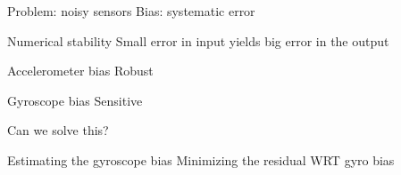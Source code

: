 \documentclass{beamer}
\begin{document}
\begin{frame}{Problem: noisy sensors}
Bias: systematic error
\end{frame}

\begin{frame}{Numerical stability}
Small error in input yields big error in the output
\end{frame}
\begin{frame}{Accelerometer bias}
Robust
\end{frame}
\begin{frame}{Gyroscope bias}
Sensitive

Can we solve this?
\end{frame}

\begin{frame}{Estimating the gyroscope bias}
Minimizing the residual WRT gyro bias
\end{frame}



\end{document}
